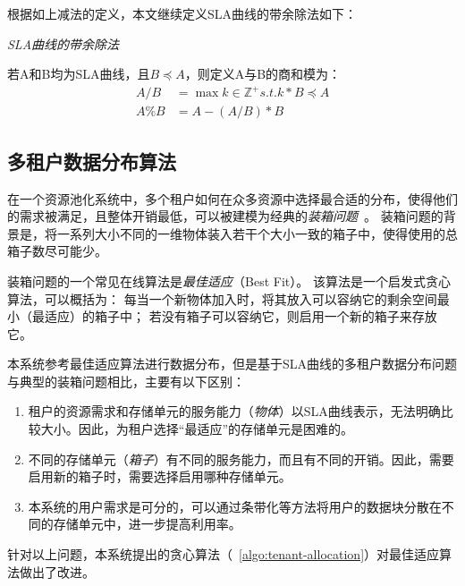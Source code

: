 根据如上减法的定义，本文继续定义SLA曲线的带余除法如下：

\begin{definition}
  \textit{SLA曲线的带余除法}

  若A和B均为SLA曲线，且$B \preceq A$，则定义A与B的商和模为：
  \begin{equation}
    \begin{split}
      A / B & = \max k \in \mathbb{Z}^{+} s.t. k * B \preceq A \\
      A \% B & = A - (A / B) * B
    \end{split}
  \end{equation}
\end{definition}


\subsection{多租户数据分布算法}
\label{sec:design-allocation-algo}

在一个资源池化系统中，多个租户如何在众多资源中选择最合适的分布，使得他们的需求被满足，且整体开销最低，可以被建模为经典的\textit{装箱问题}~\cite{wiki:Bin-packing}。
装箱问题的背景是，将一系列大小不同的一维物体装入若干个大小一致的箱子中，使得使用的总箱子数尽可能少。

装箱问题的一个常见在线算法是\textit{最佳适应}（Best Fit）。
该算法是一个启发式贪心算法，可以概括为：
每当一个新物体加入时，将其放入可以容纳它的剩余空间最小（最适应）的箱子中；
若没有箱子可以容纳它，则启用一个新的箱子来存放它。

本系统参考最佳适应算法进行数据分布，但是基于SLA曲线的多租户数据分布问题与典型的装箱问题相比，主要有以下区别：

\begin{enumerate}
  \item 租户的资源需求和存储单元的服务能力（\textit{物体}）以SLA曲线表示，无法明确比较大小。因此，为租户选择“最适应”的存储单元是困难的。
  \item 不同的存储单元（\textit{箱子}）有不同的服务能力，而且有不同的开销。因此，需要启用新的箱子时，需要选择启用哪种存储单元。
  \item 本系统的用户需求是可分的，可以通过条带化等方法将用户的数据块分散在不同的存储单元中，进一步提高利用率。
\end{enumerate}

针对以上问题，本系统提出的贪心算法（~\autoref{algo:tenant-allocation}）对最佳适应算法做出了改进。

